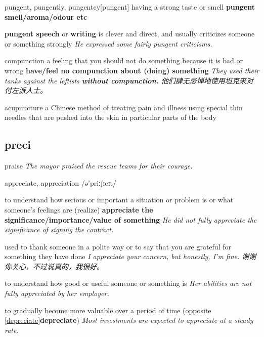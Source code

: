 \begin{DefWord}{pungent, pungently, pungentcy}[pungent]
    having a strong taste or smell
    \textbf{pungent smell/aroma/odour etc}

    \textbf{pungent speech} or \textbf{writing} is clever and direct, and usually criticizes someone or something strongly
    \textit{He expressed some fairly pungent criticisms.}
\end{DefWord}


\begin{DefWord}{compunction}
    a feeling that you should not do something because it is bad or wrong
    \textbf{have/feel no compunction about (doing) something}
    \textit{They used their tanks against the leftists \textbf{without compunction.} 他们肆无忌惮地使用坦克来对付左派人士。}
\end{DefWord}

\begin{DefWord}{acupuncture}
    a Chinese method of treating pain and illness using special thin needles that are pushed into the skin in particular parts of the body
\end{DefWord}



\subsection{preci}

\begin{RefWord}{praise}
    \textit{The mayor praised the rescue teams for their courage.}
\end{RefWord}

\begin{RefWord}{appreciate, appreciation}
    /ə'priːʃɪeɪt/

    to understand how serious or important a situation or problem is or what someone's feelings are (realize)
    \textbf{appreciate the significance/importance/value of something}
    \textit{He did not fully appreciate the significance of signing the contract.}


    used to thank someone in a polite way or to say that you are grateful for something they have done
    \textit{I appreciate your concern, but honestly, I'm fine. 谢谢你关心，不过说真的，我很好。}

    to understand how good or useful someone or something is
    \textit{Her abilities are not fully appreciated by her employer.}

    to gradually become more valuable over a period of time (opposite \ref{depreciate}\textbf{depreciate})
    \textit{Most investments are expected to appreciate at a steady rate.}
\end{RefWord}

